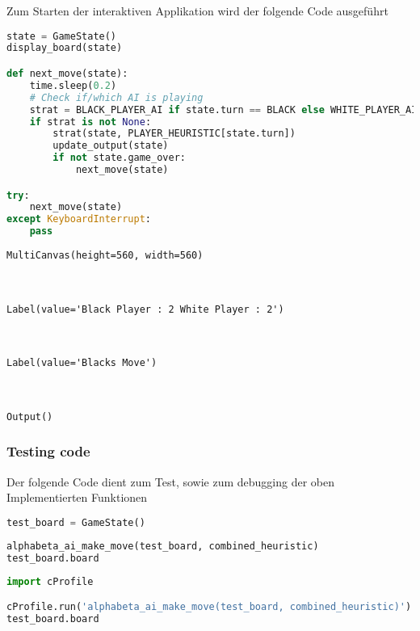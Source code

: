 Zum Starten der interaktiven Applikation wird der folgende Code
ausgeführt

\begin{lstlisting}[language=Python]
state = GameState()
display_board(state)

def next_move(state):
    time.sleep(0.2)
    # Check if/which AI is playing
    strat = BLACK_PLAYER_AI if state.turn == BLACK else WHITE_PLAYER_AI
    if strat is not None:
        strat(state, PLAYER_HEURISTIC[state.turn])
        update_output(state)
        if not state.game_over:
            next_move(state)

try:
    next_move(state)
except KeyboardInterrupt:
    pass
\end{lstlisting}

\begin{lstlisting}
MultiCanvas(height=560, width=560)



Label(value='Black Player : 2 White Player : 2')



Label(value='Blacks Move')



Output()
\end{lstlisting}

\hypertarget{testing-code}{%
\subsubsection{Testing code}\label{testing-code}}

Der folgende Code dient zum Test, sowie zum debugging der oben
Implementierten Funktionen

\begin{lstlisting}[language=Python]
test_board = GameState()
\end{lstlisting}

\begin{lstlisting}[language=Python]
alphabeta_ai_make_move(test_board, combined_heuristic)
test_board.board
\end{lstlisting}

\begin{lstlisting}[language=Python]
import cProfile

cProfile.run('alphabeta_ai_make_move(test_board, combined_heuristic)')
test_board.board
\end{lstlisting}

